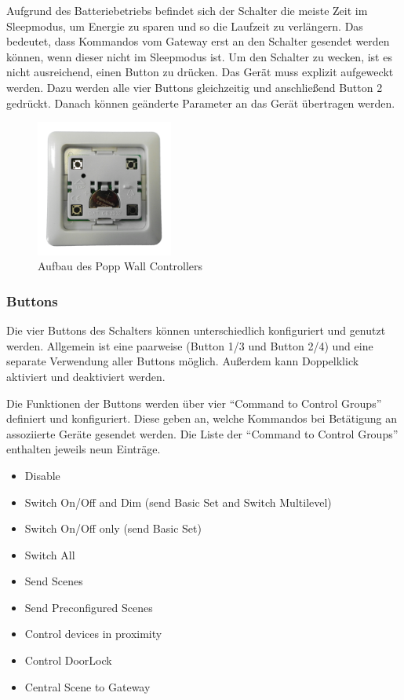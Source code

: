 Aufgrund des Batteriebetriebs befindet sich der Schalter die meiste Zeit im Sleepmodus, um Energie zu sparen und so die Laufzeit zu verlängern. Das bedeutet, dass Kommandos vom Gateway erst an den Schalter gesendet werden können, wenn dieser nicht im Sleepmodus ist. Um den Schalter zu wecken, ist es nicht ausreichend, einen Button zu drücken. Das Gerät muss explizit aufgeweckt werden. Dazu werden alle vier Buttons gleichzeitig und anschließend Button 2 gedrückt. Danach können geänderte Parameter an das Gerät übertragen werden.

\begin{figure}[h!]
	\centering
	\includegraphics[width=0.4\textwidth]{img/Sensorevaluation/PoppWallController.png}
	\caption{Aufbau des Popp Wall Controllers}
	\label{fig:sensorenPoppController}
\end{figure}

\subsubsection{Buttons}
Die vier Buttons des Schalters können unterschiedlich konfiguriert und genutzt werden. Allgemein ist eine paarweise (Button 1/3 und Button 2/4) und eine separate Verwendung aller Buttons möglich. Außerdem kann Doppelklick aktiviert und deaktiviert werden.

Die Funktionen der Buttons werden über vier "`Command to Control Groups"' definiert und konfiguriert. Diese geben an, welche Kommandos bei Betätigung an assoziierte Geräte gesendet werden. Die Liste der "`Command to Control Groups"' enthalten jeweils neun Einträge.

\begin{itemize}
	\item Disable
	\item Switch On/Off and Dim (send Basic Set and  Switch Multilevel)
	\item Switch On/Off only (send Basic Set)
	\item Switch All
	\item Send Scenes
	\item Send Preconfigured Scenes
	\item Control devices in proximity
	\item Control DoorLock
	\item Central Scene to Gateway
\end{itemize}

